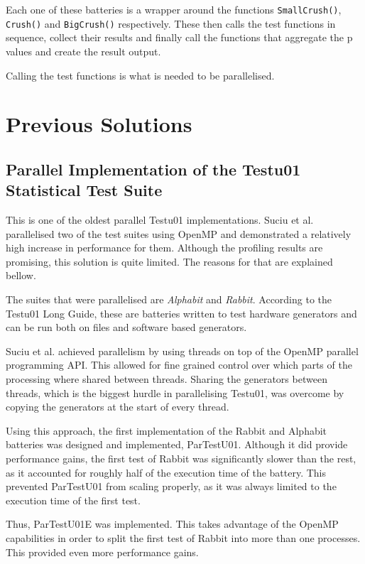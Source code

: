 Each one of these batteries is a wrapper around the functions \texttt{SmallCrush()}, \texttt{Crush()} and \texttt{BigCrush()} respectively. These then calls the test functions in sequence, collect their results and finally call the functions that aggregate the p values and create the result output.

Calling the test functions is what is needed to be parallelised.

\section{Previous Solutions}
\subsection{Parallel Implementation of the Testu01 Statistical Test Suite}
This is one of the oldest parallel Testu01 implementations. Suciu et al. parallelised two of the test suites using OpenMP and demonstrated a relatively high increase in performance for them. Although the profiling results are promising, this solution is quite limited. The reasons for that are explained bellow.

The suites that were parallelised are \textit{Alphabit} and \textit{Rabbit}. According to the Testu01 Long Guide\cite{longguide-alphabit}, these are batteries written to test hardware generators and can be run both on files and software based generators.

Suciu et al. achieved parallelism by using threads on top of the OpenMP parallel programming API\cite{openmp}. This allowed for fine grained control over which parts of the processing where shared between threads. Sharing the generators between threads, which is the biggest hurdle in parallelising Testu01, was overcome by copying the generators at the start of every thread. 

Using this approach, the first implementation of the Rabbit and Alphabit batteries was designed and implemented, ParTestU01. Although it did provide performance gains, the first test of Rabbit was significantly slower than the rest, as it accounted for roughly half of the execution time of the battery. This prevented ParTestU01 from scaling properly, as it was always limited to the execution time of the first test.

Thus, ParTestU01E was implemented. This takes advantage of the OpenMP capabilities in order to split the first test of Rabbit into more than one processes. This provided even more performance gains.

